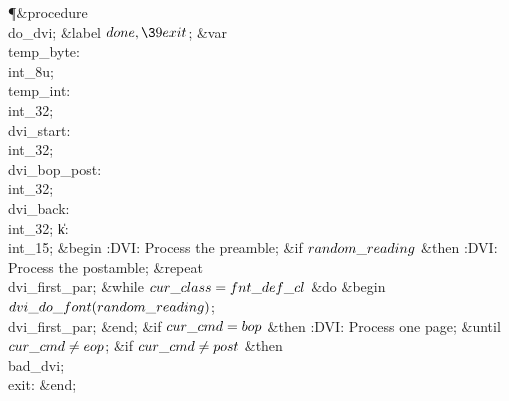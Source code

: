 \Y\P\4\&{procedure}\1\  \\{do\_dvi};\6
\4\&{label} $\\{done},\39\\{exit}$;\6
\4\&{var} \\{temp\_byte}: \\{int\_8u};\6
\\{temp\_int}: \\{int\_32};\6
\\{dvi\_start}: \\{int\_32};\6
\\{dvi\_bop\_post}: \\{int\_32};\6
\\{dvi\_back}: \\{int\_32};\6
\|k: \\{int\_15};\2\6
\&{begin} :DVI: Process the preamble\X;\6
\&{if} $\\{random\_reading}$ \1\&{then}\5
:DVI: Process the postamble\X;\2\6
\1\&{repeat} \\{dvi\_first\_par};\6
\&{while} $\\{cur\_class}=\\{fnt\_def\_cl}$ \1\&{do}\6
\&{begin} $\\{dvi\_do\_font}(\\{random\_reading})$;\5
\\{dvi\_first\_par};\6
\&{end};\2\6
\&{if} $\\{cur\_cmd}=\\{bop}$ \1\&{then}\5
:DVI: Process one page\X;\2\6
\4\&{until}\5
$\\{cur\_cmd}\ne\\{eop}$;\2\6
\&{if} $\\{cur\_cmd}\ne\\{post}$ \1\&{then}\5
\\{bad\_dvi};\2\6
\4\\{exit}: \&{end};\par
\fi

